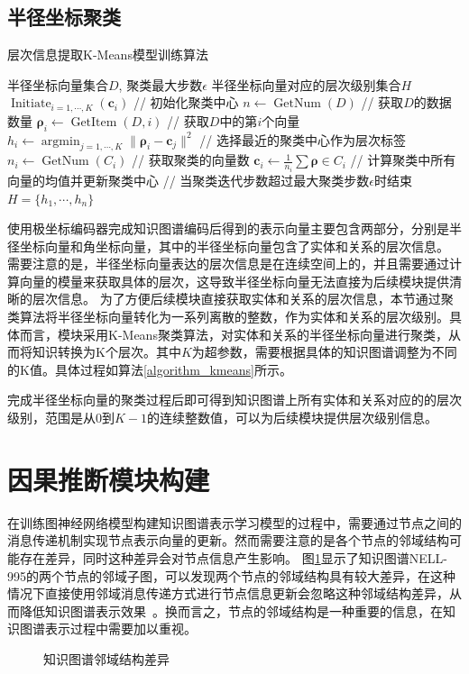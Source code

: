 \documentclass[algorithmlist, AutoFakeBold, AutoFakeSlant, figurelist, tablelist, nomlist, engineering]{seuthesix}
\begin{document}
\subsection{半径坐标聚类}
\begin{algorithm}[tb]
	\caption{层次信息提取K-Means模型训练算法}  
	\label{algorithm_kmeans}
	\begin{algorithmic}[1]
  \Require 半径坐标向量集合$D$, 聚类最大步数$\epsilon$
  \Ensure 半径坐标向量对应的层次级别集合$H$
  \State $\operatorname{Initiate}_{i=1, \cdots, K}(\bm{c}_i)$ // 初始化聚类中心
  \State $n \leftarrow \operatorname{GetNum}(D)$ // 获取$D$的数据数量
  \Repeat 
  \State $\bm{\rho}_i \leftarrow \operatorname{GetItem}(D, i)$ // 获取$D$中的第$i$个向量
  \State $h_i \leftarrow \operatorname{argmin}_{j=1, \cdots, K} \|\bm{\rho}_i - \bm{c}_j\|^2$ // 选择最近的聚类中心作为层次标签
  \EndFor
  \State $n_i \leftarrow \operatorname{GetNum}(C_i)$ // 获取聚类的向量数
  \State $\bm{c}_i \leftarrow \frac{1}{n_i} \sum{\bm{\rho} \in C_i}$ // 计算聚类中所有向量的均值并更新聚类中心
  \EndFor
   // 当聚类迭代步数超过最大聚类步数$\epsilon$时结束
  \State \Return $H = \{h_1, \cdots, h_n\}$
	\end{algorithmic}
\end{algorithm} 
使用极坐标编码器完成知识图谱编码后得到的表示向量主要包含两部分，分别是半径坐标向量和角坐标向量，其中的半径坐标向量包含了实体和关系的层次信息。
需要注意的是，半径坐标向量表达的层次信息是在连续空间上的，并且需要通过计算向量的模量来获取具体的层次，这导致半径坐标向量无法直接为后续模块提供清晰的层次信息。
为了方便后续模块直接获取实体和关系的层次信息，本节通过聚类算法将半径坐标向量转化为一系列离散的整数，作为实体和关系的层次级别。具体而言，模块采用K-Means聚类算法，对实体和关系的半径坐标向量进行聚类，从而将知识转换为K个层次。其中$K$为超参数，需要根据具体的知识图谱调整为不同的K值。具体过程如算法\ref{algorithm_kmeans}所示。

完成半径坐标向量的聚类过程后即可得到知识图谱上所有实体和关系对应的的层次级别，范围是从0到$K-1$的连续整数值，可以为后续模块提供层次级别信息。

\section{因果推断模块构建}
在训练图神经网络模型构建知识图谱表示学习模型的过程中，需要通过节点之间的消息传递机制实现节点表示向量的更新。然而需要注意的是各个节点的邻域结构可能存在差异，同时这种差异会对节点信息产生影响。
图\ref{2_LocalStructure}显示了知识图谱NELL-995的两个节点的邻域子图，可以发现两个节点的邻域结构具有较大差异，在这种情况下直接使用邻域消息传递方式进行节点信息更新会忽略这种邻域结构差异，从而降低知识图谱表示效果~\cite{chen2020measuring}。换而言之，节点的邻域结构是一种重要的信息，在知识图谱表示过程中需要加以重视。
\begin{figure}
  \centering
  \caption{知识图谱邻域结构差异}
  \label{2_LocalStructure}
\end{figure}
\end{document}
